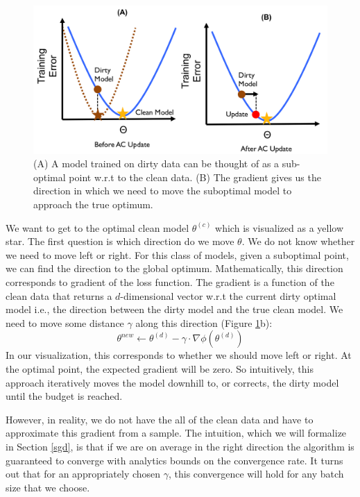 \begin{figure}[ht!]
\centering
 \includegraphics[width=\columnwidth]{figs/update-arch2.png}
 \caption{(A) A model trained on dirty data can be thought of as a sub-optimal point w.r.t to the clean data. (B) The gradient gives us the direction in which we need to move the suboptimal model to approach the true optimum. \label{update-arch2}}
\end{figure}

We want to get to the optimal clean model $\theta^{(c)}$ which is visualized as a yellow star.
The first question is which direction do we move $\theta$.
We do not know whether we need to move left or right.
For this class of models, given a suboptimal point, we can find the direction to 
the global optimum.
Mathematically, this direction corresponds to gradient of the loss function.
The gradient is a function of the clean data that returns a $d$-dimensional vector w.r.t the current dirty optimal model i.e., the direction between the dirty model and the true clean model.
We need to move some distance $\gamma$ along this direction (Figure \ref{update-arch2}b):
\[
\theta^{new} \leftarrow \theta^{(d)} - \gamma \cdot \nabla\phi(\theta^{(d)})
\]
In our visualization, this corresponds to whether we should move left or right.
At the optimal point, the expected gradient will be zero.
So intuitively, this approach iteratively moves the model downhill to, or corrects, the dirty model until the budget is reached.

However, in reality, we do not have the all of the clean data and have to approximate this gradient from a sample.
The intuition, which we will formalize in Section \ref{sgd}, is that if we are on average in the right direction the algorithm is guaranteed to converge with analytics bounds on the convergence rate.
It turns out that for an appropriately chosen $\gamma$, this convergence will hold for any batch size that we choose.


